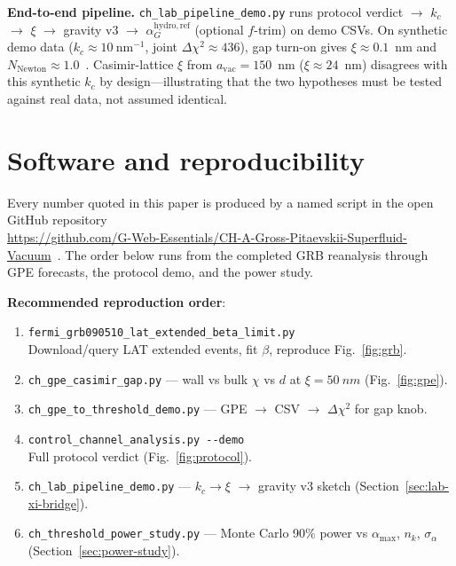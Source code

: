 \documentclass[11pt,a4paper]{article}
\newcommand{\py}[1]{\nolinkurl{#1}}
\begin{document}
\textbf{End-to-end pipeline.}
\texttt{ch\_lab\_pipeline\_demo.py} runs protocol verdict $\to$ $k_c$ $\to$ $\xi$ $\to$ gravity v3 $\to$ $\alpha_G^{\mathrm{hydro,ref}}$ (optional $f$-trim) on demo CSVs.
On synthetic demo data ($k_c \approx 10~\mathrm{nm}^{-1}$, joint $\Delta\chi^2 \approx 436$), gap turn-on gives $\xi \approx 0.1$~nm and $N_{\mathrm{Newton}} \approx 1.0$~\cite{CHSpaceFabric2026}.
Casimir-lattice $\xi$ from $a_{\mathrm{vac}} = 150$~nm ($\xi \approx 24$~nm) disagrees with this synthetic $k_c$ by design---illustrating that the two hypotheses must be tested against real data, not assumed identical.


\section{Software and reproducibility}
\label{sec:software}

Every number quoted in this paper is produced by a named script in the open GitHub repository\\
\url{https://github.com/G-Web-Essentials/CH-A-Gross-Pitaevskii-Superfluid-Vacuum}~\cite{CHSpaceFabric2026}.
The order below runs from the completed GRB reanalysis through GPE forecasts, the protocol demo, and the power study.

\textbf{Recommended reproduction order}:
\begin{enumerate}[label=\arabic*., leftmargin=*]
  \item \py{fermi_grb090510_lat_extended_beta_limit.py}\\
    Download/query LAT extended events, fit $\beta$, reproduce Fig.~\ref{fig:grb}.
  \item \py{ch_gpe_casimir_gap.py} --- wall vs bulk $\chi$ vs $d$ at $\xi = \SI{50}{nm}$ (Fig.~\ref{fig:gpe}).
  \item \py{ch_gpe_to_threshold_demo.py} --- GPE $\to$ CSV $\to$ $\Delta\chi^2$ for gap knob.
  \item \py{control_channel_analysis.py --demo}\\
    Full protocol verdict (Fig.~\ref{fig:protocol}).
  \item \py{ch_lab_pipeline_demo.py} --- $k_c \to \xi$ $\to$ gravity v3 sketch (Section~\ref{sec:lab-xi-bridge}).
  \item \py{ch_threshold_power_study.py} --- Monte Carlo 90\% power vs $\alpha_{\max}$, $n_k$, $\sigma_\alpha$ (Section~\ref{sec:power-study}).
\end{enumerate}
\end{document}
